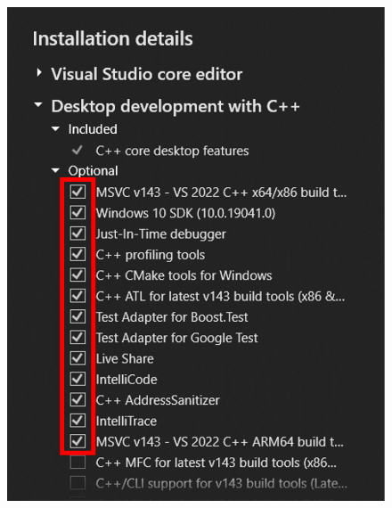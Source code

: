 {    \begin{figure}[H]
        \centering
        \setlength{\belowcaptionskip}{-10pt}
        \includegraphics[scale=0.7]{Images/1.Intro.3.1.png} \hspace{5mm}

\end{figure}}
